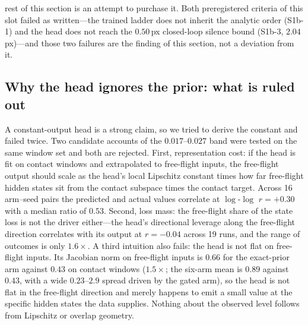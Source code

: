 \documentclass{article}
\begin{document}
rest of this section is an attempt to purchase it. Both preregistered criteria of this slot failed as written---the trained ladder does not inherit the analytic order (S1b-1) and the head does not reach the $0.50$\,px closed-loop silence bound (S1b-3, $2.04$\,px)---and those two failures are the finding of this section, not a deviation from it.

\subsection{Why the head ignores the prior: what is ruled out}
\label{sec:flooranalysis}

A constant-output head is a strong claim, so we tried to derive the constant and
failed twice. Two candidate accounts of the $0.017$--$0.027$ band were tested on
the same window set and both are rejected. First, representation cost: if the head
is fit on contact windows and extrapolated to free-flight inputs, the free-flight
output should scale as the head's local Lipschitz constant times how far free-flight
hidden states sit from the contact subspace times the contact target. Across 16
arm--seed pairs the predicted and actual values correlate at $\log$-$\log$
$r{=}{+}0.30$ with a median ratio of $0.53$. Second, loss mass: the free-flight
share of the state loss is not the driver either---the head's directional leverage
along the free-flight direction correlates with its output at $r{=}{-}0.04$ across
19 runs, and the range of outcomes is only $1.6\times$. A third intuition also fails:
the head is not flat on free-flight inputs. Its Jacobian norm on free-flight inputs is $0.66$ for the exact-prior arm against
$0.43$ on contact windows ($1.5\times$; the six-arm mean is $0.89$ against $0.43$,
with a wide $0.23$--$2.9$ spread driven by the gated arm), so the head is not flat
in the free-flight direction and merely happens to emit a small value at the specific hidden states the data supplies.
Nothing about the observed level follows from Lipschitz or overlap geometry.
\end{document}
